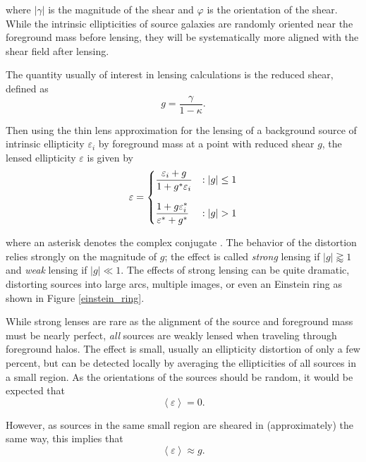 \documentclass[%
 reprint,
 amsmath,amssymb,
 aps,nofootinbib
]{revtex4-1}
\begin{document}
\noindent where $|\gamma|$ is the magnitude of the shear and $\varphi$ is the orientation of the shear. While the intrinsic ellipticities of source galaxies are randomly oriented near the foreground mass before lensing, they will be systematically more aligned with the shear field after lensing.

The quantity usually of interest in lensing calculations is the reduced shear, defined as
\begin{equation}\label{reduced_shear}
g=\frac{\gamma}{1-\kappa}.
\end{equation}

\noindent Then using the thin lens approximation for the lensing of a background source of intrinsic ellipticity $\varepsilon_i$ by foreground mass at a point with reduced shear $g$, the lensed ellipticity $\varepsilon$ is given by
\begin{equation}\label{lensing}
 \varepsilon = \begin{dcases}
      \frac{\varepsilon_i+g}{1+g^*\varepsilon_i} & : |g|\leq1 \\[0.75em]
       \frac{1+g\varepsilon_i^*}{\varepsilon^*+g^*} & : |g|>1
   \end{dcases}
\end{equation}

\noindent where an asterisk denotes the complex conjugate \cite{schneider}. The behavior of the distortion relies strongly on the magnitude of $g$; the
effect is called \textit{strong} lensing if $|g|\gtrapprox1$ and \textit{weak} lensing if $|g|\ll1$. The effects of strong lensing can be quite dramatic, distorting sources into large arcs, multiple images, or even an Einstein ring as shown in Figure \ref{einstein_ring}.

While strong lenses are rare as the alignment of the source and foreground mass must be nearly perfect, \textit{all} sources are weakly lensed when traveling through foreground halos. The effect is small, usually an ellipticity distortion of only a few percent, but can be detected locally by averaging the ellipticities of all sources in a small region. As the orientations of the sources should be random, it would be expected that
$$\left<\varepsilon\right>=0.$$

\noindent However, as sources in the same small region are sheared in (approximately) the same way, this implies that
\begin{equation}
\left<\varepsilon\right>\approx g.
\end{equation}
\end{document}
